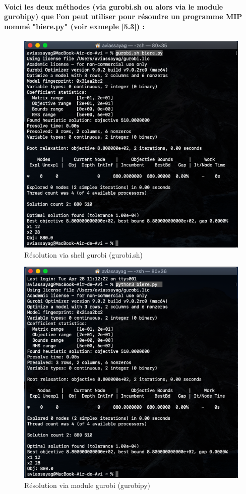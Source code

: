 \documentclass[a4paper, 12pt, twoside]{article}
\begin{document}
\paragraph{ Voici les deux méthodes (via gurobi.sh ou alors via le module gurobipy) que l'on peut utiliser pour résoudre un programme MIP nommé "biere.py" (voir exmeple [5.3]) :}
\begin{center}
\begin{figure}[h]
\centering
\includegraphics[scale=0.4]{gurobish.png}
\caption{Résolution via shell gurobi (gurobi.sh)}
\end{figure}
\begin{figure}[h]
\centering
\includegraphics[scale=0.4]{gurobipython.png}
\caption{Résolution via module gurobi (gurobipy)}
\end{figure}
\end{center}
\end{document}
